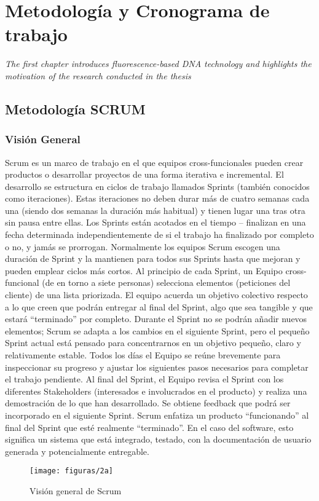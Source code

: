 \chapter{Metodología y Cronograma de trabajo}
\label{chap:metodologia}
\textit{The first chapter introduces fluorescence-based DNA technology and highlights the motivation of the research conducted in the thesis}
\vfill
\minitoc
\newpage

\section{Metodología SCRUM}
\subsection{Visión General}
Scrum es un marco de trabajo en el que equipos cross-funcionales pueden crear productos o desarrollar proyectos de una forma iterativa e incremental. El desarrollo se estructura en ciclos de trabajo llamados Sprints (también conocidos como iteraciones). Estas iteraciones no deben durar más de cuatro semanas cada una (siendo dos semanas la duración más habitual) y tienen lugar una tras otra sin pausa entre ellas. Los Sprints están acotados en el tiempo – finalizan en una fecha determinada independientemente de si el trabajo ha finalizado por completo o no, y jamás se prorrogan. Normalmente los equipos Scrum escogen una duración de Sprint y la mantienen para todos sus Sprints hasta que mejoran y pueden emplear ciclos más cortos. Al principio de cada Sprint, un Equipo cross-funcional (de en torno a siete personas) selecciona elementos (peticiones del cliente) de una lista priorizada. El equipo acuerda un objetivo colectivo respecto a lo que creen que podrán entregar al final del Sprint, algo que sea tangible y que estará “terminado” por completo. Durante el Sprint no se podrán añadir nuevos elementos; Scrum se adapta a los cambios en el siguiente Sprint, pero el pequeño Sprint actual está pensado para concentrarnos en un objetivo pequeño, claro y relativamente estable. Todos los días el Equipo se reúne brevemente para inspeccionar su progreso y ajustar los siguientes pasos necesarios para completar el trabajo pendiente. Al final del Sprint, el Equipo revisa el Sprint con los diferentes Stakeholders (interesados e involucrados en el producto) y realiza una demostración de lo que han desarrollado. Se obtiene feedback que podrá ser incorporado en el siguiente Sprint. Scrum enfatiza un producto “funcionando” al final del Sprint que esté realmente “terminado”. En el caso del software, esto significa un sistema que está integrado, testado, con la documentación de usuario generada y potencialmente entregable.
  \begin{figure}[H]
  	\centering
  	\texttt{[image: figuras/2a]}
  	\captionsetup{width=.95\textwidth}
  	\caption{Visión general de Scrum}
  	\label{figura2a}
  \end{figure}

